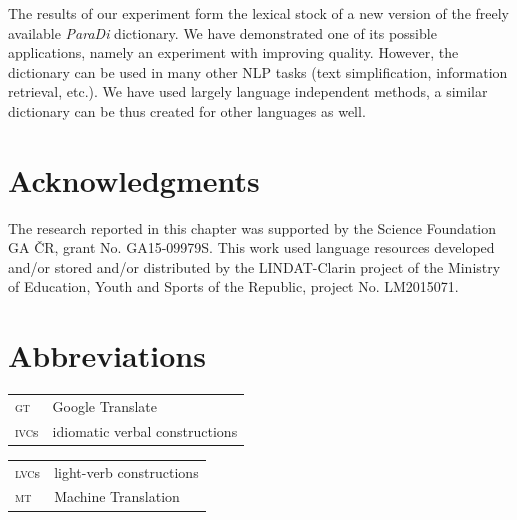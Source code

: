 \documentclass[output=paper,modfonts,nonflat]{langsci/langscibook}
\begin{document}
The results of our experiment form the lexical stock of a new version of the 
freely available \textit{ParaDi} dictionary. We have demonstrated one of its 
possible applications, namely an experiment with improving  
quality. However, the dictionary can be used in many other NLP tasks (text 
simplification, information retrieval, etc.). We have used largely language 
independent methods, a similar dictionary can be thus created for other 
languages as well.

\section*{Acknowledgments}
The research reported in this chapter was supported by the  Science 
Foundation GA ČR, grant No. GA15-09979S. This work used language 
resources developed and/or stored and/or distributed by the LINDAT-Clarin 
project of the Ministry of Education, Youth and Sports of the  Republic, 
project No. LM2015071.

\section*{Abbreviations}
\begin{tabularx}{.5\textwidth}{ll}
\textsc{gt} & Google Translate \\
\textsc{ivc}s & idiomatic verbal constructions \\
\end{tabularx}
\begin{tabularx}{.45\textwidth}{ll}
\textsc{lvc}s & light-verb constructions \\
\textsc{mt} & Machine Translation \\
\end{tabularx}

{\sloppy
\printbibliography[heading=subbibliography,notkeyword=this]
}
\end{document}
